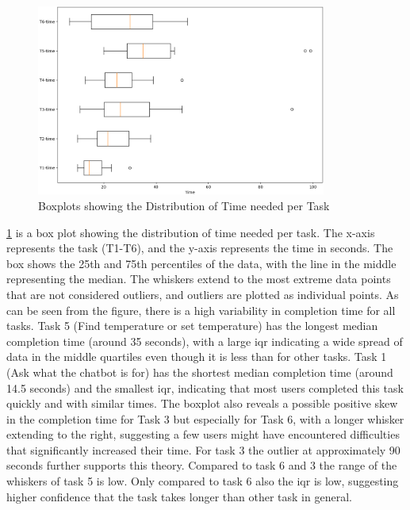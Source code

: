 \begin{figure}[h]
    \centering
    \captionsetup{justification=centering}
    \includegraphics[width=0.85\textwidth]{graphics/time-boxplots.png}
    \caption{Boxplots showing the Distribution of Time needed per Task}
    \label{fig:task-boxplots}
\end{figure}

\cref{fig:task-boxplots} is a box plot showing the distribution of time needed per task. The x-axis represents the task (T1-T6), and the y-axis represents the time in seconds. The box shows the 25th and 75th percentiles of the data, with the line in the middle representing the median. The whiskers extend to the most extreme data points that are not considered outliers, and outliers are plotted as individual points. As can be seen from the figure, there is a high variability in completion time for all tasks. Task 5 (Find temperature or set temperature) has the longest median completion time (around 35 seconds), with a large \gls{iqr}  indicating a wide spread of data in the middle quartiles even though it is less than for other tasks. Task 1 (Ask what the chatbot is for) has the shortest median completion time (around 14.5 seconds) and the smallest \gls{iqr}, indicating that most users completed this task quickly and with similar times.
The boxplot also reveals a possible positive skew in the completion time for Task 3 but especially for Task 6, with a longer whisker extending to the right, suggesting a few users might have encountered difficulties that significantly increased their time.
For task 3 the outlier at approximately 90 seconds further supports this theory.
Compared to task 6 and 3 the range of the whiskers of task 5 is low. Only compared to task 6 also the \gls{iqr} is low, suggesting higher confidence that the task takes longer than other task in general.

